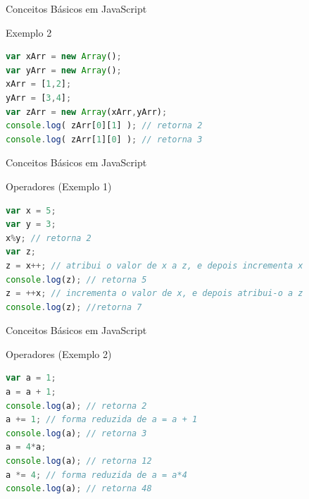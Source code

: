\documentclass[xcolor=dvipsnames,table]{beamer}
\begin{document}
\begin{frame}[fragile]{Conceitos Básicos em JavaScript}
\begin{block}{Exemplo 2}
\begin{lstlisting}[language=JavaScript]
var xArr = new Array();
var yArr = new Array();
xArr = [1,2];
yArr = [3,4];
var zArr = new Array(xArr,yArr);
console.log( zArr[0][1] ); // retorna 2
console.log( zArr[1][0] ); // retorna 3
\end{lstlisting}	
\end{block}
\end{frame}

\begin{frame}[fragile]{Conceitos Básicos em JavaScript}
\begin{block}{Operadores (Exemplo 1)}
\begin{lstlisting}[language=JavaScript]
var x = 5;
var y = 3;
x%y; // retorna 2
var z;
z = x++; // atribui o valor de x a z, e depois incrementa x
console.log(z); // retorna 5
z = ++x; // incrementa o valor de x, e depois atribui-o a z
console.log(z); //retorna 7
\end{lstlisting}	
\end{block}
\end{frame}

\begin{frame}[fragile]{Conceitos Básicos em JavaScript}
\begin{block}{Operadores (Exemplo 2)}
\begin{lstlisting}[language=JavaScript]
var a = 1;
a = a + 1;
console.log(a); // retorna 2
a += 1; // forma reduzida de a = a + 1
console.log(a); // retorna 3
a = 4*a;
console.log(a); // retorna 12
a *= 4; // forma reduzida de a = a*4
console.log(a); // retorna 48
\end{lstlisting}	
\end{block}
\end{frame}
\end{document}
